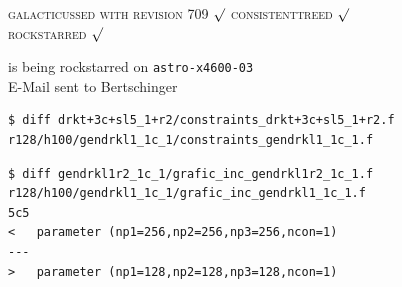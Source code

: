 \textsc{galacticussed with revision 709} $\surd$
\textsc{consistenttreed} $\surd$ \\ 
\textsc{rockstarred} $\surd$

is being rockstarred on \texttt{astro-x4600-03} \\

E-Mail sent to Bertschinger \\

\begin{verbatim}
$ diff drkt+3c+sl5_1+r2/constraints_drkt+3c+sl5_1+r2.f 
r128/h100/gendrkl1_1c_1/constraints_gendrkl1_1c_1.f 
\end{verbatim}
\begin{verbatim}
$ diff gendrkl1r2_1c_1/grafic_inc_gendrkl1r2_1c_1.f  
r128/h100/gendrkl1_1c_1/grafic_inc_gendrkl1_1c_1.f 
5c5
< 	parameter (np1=256,np2=256,np3=256,ncon=1)
---
> 	parameter (np1=128,np2=128,np3=128,ncon=1)
\end{verbatim}

